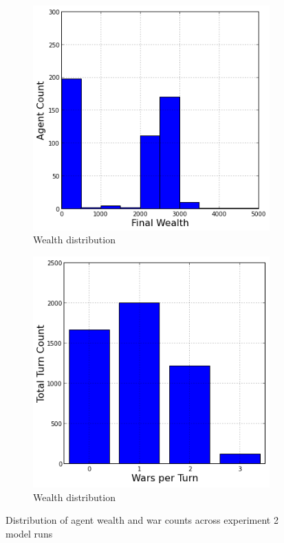 \documentclass{article}
\begin{document}
\begin{figure}[h!]
	\centering
	\begin{subfigure}{0.49\textwidth}
		\includegraphics[width=\textwidth]{Graphics/Exp2WealthDistribution}
		\caption{Wealth distribution}
	\end{subfigure}
	\begin{subfigure}{0.49\textwidth}
		\includegraphics[width=\textwidth]{Graphics/Exp2WarDistribution}
		\caption{Wealth distribution}
	\end{subfigure}
\caption{Distribution of agent wealth and war counts across experiment 2 model runs}
\end{figure}
\end{document}
